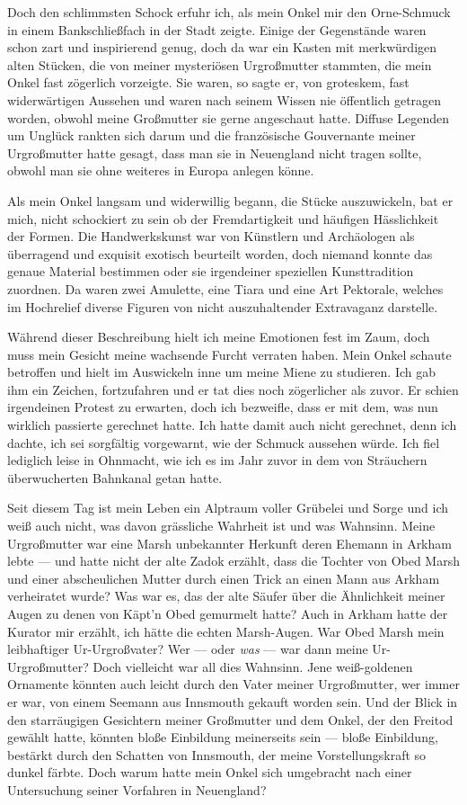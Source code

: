 Doch den schlimmsten Schock erfuhr ich, als mein Onkel mir den Orne-Schmuck in einem Bankschließfach in der Stadt zeigte. Einige der Gegenstände waren schon zart und inspirierend genug, doch da war ein Kasten mit merkwürdigen alten Stücken, die von meiner mysteriösen Urgroßmutter stammten, die mein Onkel fast zögerlich vorzeigte. Sie waren, so sagte er, von groteskem, fast widerwärtigen Aussehen und waren nach seinem Wissen nie öffentlich getragen worden, obwohl meine Großmutter sie gerne angeschaut hatte. Diffuse Legenden um Unglück rankten sich darum und die französische Gouvernante meiner Urgroßmutter hatte gesagt, dass man sie in Neuengland nicht tragen sollte, obwohl man sie ohne weiteres in Europa anlegen könne.

Als mein Onkel langsam und widerwillig begann, die Stücke auszuwickeln, bat er mich, nicht schockiert zu sein ob der Fremdartigkeit und häufigen Hässlichkeit der Formen. Die Handwerkskunst war von Künstlern und Archäologen als überragend und exquisit exotisch beurteilt worden, doch niemand konnte das genaue Material bestimmen oder sie irgendeiner speziellen Kunsttradition zuordnen. Da waren zwei Amulette, eine Tiara und eine Art Pektorale, welches im Hochrelief diverse Figuren von nicht auszuhaltender Extravaganz darstelle.

Während dieser Beschreibung hielt ich meine Emotionen fest im Zaum, doch muss mein Gesicht meine wachsende Furcht verraten haben. Mein Onkel schaute betroffen und hielt im Auswickeln inne um meine Miene zu studieren. Ich gab ihm ein Zeichen, fortzufahren und er tat dies noch zögerlicher als zuvor. Er schien irgendeinen Protest zu erwarten, doch ich bezweifle, dass er mit dem, was nun wirklich passierte gerechnet hatte. Ich hatte damit auch nicht gerechnet, denn ich dachte, ich sei sorgfältig vorgewarnt, wie der Schmuck aussehen würde. Ich fiel lediglich leise in Ohnmacht, wie ich es im Jahr zuvor in dem von Sträuchern überwucherten Bahnkanal getan hatte.

Seit diesem Tag ist mein Leben ein Alptraum voller Grübelei und Sorge und ich weiß auch nicht, was davon grässliche Wahrheit ist und was Wahnsinn. Meine Urgroßmutter war eine Marsh unbekannter Herkunft deren Ehemann in Arkham lebte --- und hatte nicht der alte Zadok erzählt, dass die Tochter von Obed Marsh und einer abscheulichen Mutter durch einen Trick an einen Mann aus Arkham verheiratet wurde? Was war es, das der alte Säufer über die Ähnlichkeit meiner Augen zu denen von Käpt'n Obed gemurmelt hatte? Auch in Arkham hatte der Kurator mir erzählt, ich hätte die echten Marsh-Augen. War Obed Marsh mein leibhaftiger Ur-Urgroßvater? Wer --- oder \textit{was}  --- war dann meine Ur-Urgroßmutter? Doch vielleicht war all dies Wahnsinn. Jene weiß-goldenen Ornamente könnten auch leicht durch den Vater meiner Urgroßmutter, wer immer er war, von einem Seemann aus Innsmouth gekauft worden sein. Und der Blick in den starräugigen Gesichtern meiner Großmutter  und dem Onkel, der den Freitod gewählt hatte, könnten bloße Einbildung meinerseits sein --- bloße Einbildung, bestärkt durch den Schatten von Innsmouth, der meine Vorstellungskraft so dunkel färbte. Doch warum hatte mein Onkel sich umgebracht nach einer Untersuchung seiner Vorfahren in Neuengland?

